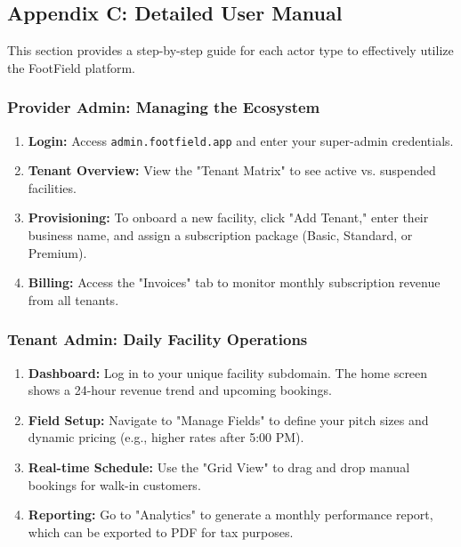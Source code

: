 \subsection*{Appendix C: Detailed User Manual}
This section provides a step-by-step guide for each actor type to effectively utilize the FootField platform.

\subsubsection{Provider Admin: Managing the Ecosystem}
\begin{enumerate}
    \item \textbf{Login:} Access \texttt{admin.footfield.app} and enter your super-admin credentials.
    \item \textbf{Tenant Overview:} View the "Tenant Matrix" to see active vs. suspended facilities.
    \item \textbf{Provisioning:} To onboard a new facility, click "Add Tenant," enter their business name, and assign a subscription package (Basic, Standard, or Premium).
    \item \textbf{Billing:} Access the "Invoices" tab to monitor monthly subscription revenue from all tenants.
\end{enumerate}

\subsubsection{Tenant Admin: Daily Facility Operations}
\begin{enumerate}
    \item \textbf{Dashboard:} Log in to your unique facility subdomain. The home screen shows a 24-hour revenue trend and upcoming bookings.
    \item \textbf{Field Setup:} Navigate to "Manage Fields" to define your pitch sizes and dynamic pricing (e.g., higher rates after 5:00 PM).
    \item \textbf{Real-time Schedule:} Use the "Grid View" to drag and drop manual bookings for walk-in customers.
    \item \textbf{Reporting:} Go to "Analytics" to generate a monthly performance report, which can be exported to PDF for tax purposes.
\end{enumerate}

